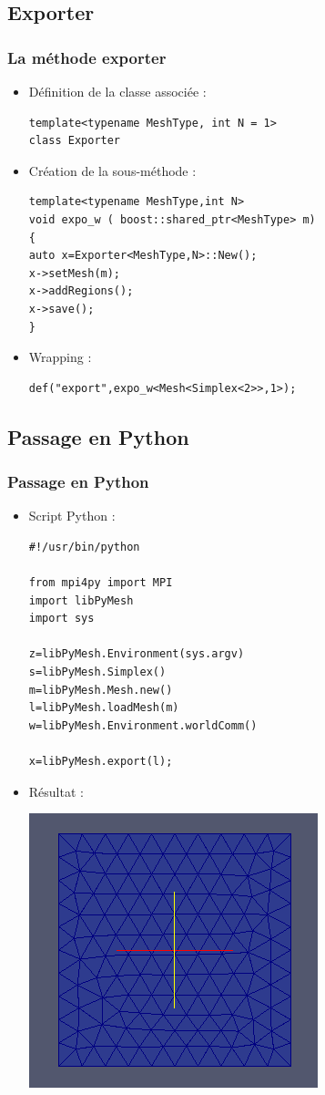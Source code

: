 \documentclass[french,10pt]{beamer}
\begin{document}
\subsection{Exporter}
\begin{frame}[fragile]
\frametitle{La méthode exporter}
\begin{itemize}
\item Définition de la classe associée :
\begin{lstlisting}
template<typename MeshType, int N = 1>
class Exporter
\end{lstlisting}
\item Création de la sous-méthode :
\begin{lstlisting}
template<typename MeshType,int N>
void expo_w ( boost::shared_ptr<MeshType> m)
{
auto x=Exporter<MeshType,N>::New();
x->setMesh(m);
x->addRegions();
x->save();
}
\end{lstlisting}
\item Wrapping :
\begin{lstlisting}
def("export",expo_w<Mesh<Simplex<2>>,1>);
\end{lstlisting}
\end{itemize}
\end{frame}

\subsection{Passage en Python}
\begin{frame}[fragile]
\frametitle{Passage en Python}
\begin{itemize}
\item Script Python :
\begin{lstlisting}
#!/usr/bin/python

from mpi4py import MPI
import libPyMesh
import sys

z=libPyMesh.Environment(sys.argv)
s=libPyMesh.Simplex()
m=libPyMesh.Mesh.new()
l=libPyMesh.loadMesh(m)
w=libPyMesh.Environment.worldComm()

x=libPyMesh.export(l);
\end{lstlisting}
\item Résultat :

\includegraphics[scale=0.30]{Mesh1.png} 
\end{itemize}
\end{frame}
\end{document}
